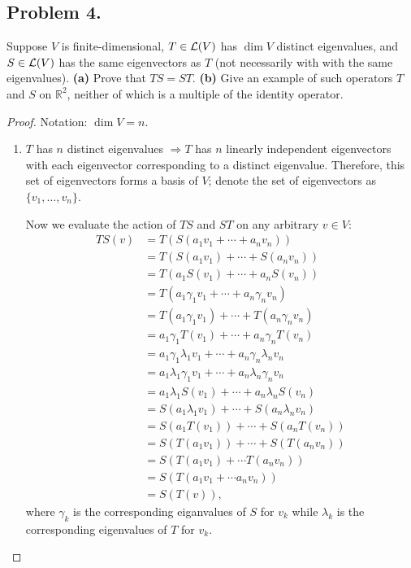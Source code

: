 \documentclass{article}
\renewcommand*{\implies}{\ensuremath{\Longrightarrow}}
\newcommand*{\R}{\ensuremath{\mathbb{R}}}
\begin{document}
\newpage
\subsection*{Problem 4.}
Suppose $V$ is finite-dimensional, $T \in {\cal L}(V)$ has $\dim V$ distinct eigenvalues,
and $S \in {\cal L}(V)$ has the same eigenvectors as $T$ (not necessarily with with the same eigenvalues).
\textbf{(a)} Prove that $TS=ST$. \textbf{(b)} Give an example of such operators $T$ and $S$ on $\R^2$, neither of 
which is a multiple of the identity operator.
\begin{proof} Notation: $\dim V=n$.
    \begin{enumerate}[label=(\alph*)]
        \item $T$ has $n$ distinct eigenvalues \implies $T$ has $n$ linearly independent 
        eigenvectors with each eigenvector corresponding to a distinct eigenvalue. Therefore, 
        this set of eigenvectors forms a basis of $V$; denote the set of eigenvectors as
        $\{v_1,\dots,v_n\}$.
        
        Now we evaluate the action of $TS$ and $ST$ on any arbitrary $v\in V$:
        \begin{align*}
            TS(v) & = T(S(a_1v_1 + \cdots + a_nv_n)) \\
            & = T(S(a_1v_1) + \cdots + S(a_nv_n)) \\
            & = T(a_1S(v_1) + \cdots + a_nS(v_n)) \\
            & = T(a_1\gamma_1v_1 + \cdots + a_n\gamma_nv_n) \\
            & = T(a_1\gamma_1v_1) + \cdots + T(a_n\gamma_nv_n) \\
            & = a_1\gamma_1T(v_1) + \cdots + a_n\gamma_nT(v_n) \\
            & = a_1\gamma_1\lambda_1v_1 + \cdots + a_n\gamma_n\lambda_nv_n \\
            & = a_1\lambda_1\gamma_1v_1 + \cdots + a_n\lambda_n\gamma_nv_n \\
            & = a_1\lambda_1S(v_1) + \cdots + a_n\lambda_nS(v_n) \\
            & = S(a_1\lambda_1v_1) + \cdots + S(a_n\lambda_nv_n) \\
            & = S(a_1T(v_1)) + \cdots + S(a_nT(v_n)) \\
            & = S(T(a_1v_1)) + \cdots + S(T(a_nv_n)) \\
            & = S(T(a_1v_1) +\cdots T(a_nv_n)) \\
            & = S(T(a_1v_1+\cdots a_nv_n)) \\
            & = S(T(v)),
        \end{align*}
        where $\gamma_k$ is the corresponding eiganvalues of $S$ for $v_k$ while 
        $\lambda_k$ is the corresponding eigenvalues of $T$ for $v_k$.


\end{enumerate}
\end{proof}
\end{document}
